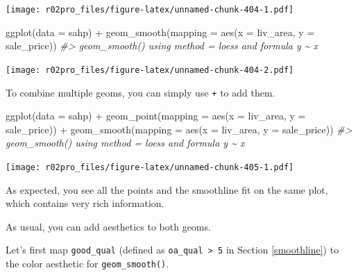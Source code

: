 \documentclass[
]{book}
\newenvironment{Shaded}{\begin{snugshade}}{\end{snugshade}}
\newcommand{\AttributeTok}[1]{\textcolor[rgb]{0.77,0.63,0.00}{#1}}
\newcommand{\CommentTok}[1]{\textcolor[rgb]{0.56,0.35,0.01}{\textit{#1}}}
\newcommand{\FunctionTok}[1]{\textcolor[rgb]{0.00,0.00,0.00}{#1}}
\newcommand{\NormalTok}[1]{#1}
\newcommand{\SpecialCharTok}[1]{\textcolor[rgb]{0.00,0.00,0.00}{#1}}
\begin{document}
\texttt{[image: r02pro\_files/figure-latex/unnamed-chunk-404-1.pdf]}

\begin{Shaded}
\begin{Highlighting}[]
\FunctionTok{ggplot}\NormalTok{(}\AttributeTok{data =}\NormalTok{ sahp) }\SpecialCharTok{+} \FunctionTok{geom\_smooth}\NormalTok{(}\AttributeTok{mapping =} \FunctionTok{aes}\NormalTok{(}\AttributeTok{x =}\NormalTok{ liv\_area, }\AttributeTok{y =}\NormalTok{ sale\_price))}
\CommentTok{\#\textgreater{} \textasciigrave{}geom\_smooth()\textasciigrave{} using method = \textquotesingle{}loess\textquotesingle{} and formula \textquotesingle{}y \textasciitilde{} x\textquotesingle{}}
\end{Highlighting}
\end{Shaded}

\texttt{[image: r02pro\_files/figure-latex/unnamed-chunk-404-2.pdf]}

To combine multiple geoms, you can simply use \texttt{+} to add them.

\begin{Shaded}
\begin{Highlighting}[]
\FunctionTok{ggplot}\NormalTok{(}\AttributeTok{data =}\NormalTok{ sahp) }\SpecialCharTok{+} \FunctionTok{geom\_point}\NormalTok{(}\AttributeTok{mapping =} \FunctionTok{aes}\NormalTok{(}\AttributeTok{x =}\NormalTok{ liv\_area, }\AttributeTok{y =}\NormalTok{ sale\_price)) }\SpecialCharTok{+} \FunctionTok{geom\_smooth}\NormalTok{(}\AttributeTok{mapping =} \FunctionTok{aes}\NormalTok{(}\AttributeTok{x =}\NormalTok{ liv\_area, }\AttributeTok{y =}\NormalTok{ sale\_price))}
\CommentTok{\#\textgreater{} \textasciigrave{}geom\_smooth()\textasciigrave{} using method = \textquotesingle{}loess\textquotesingle{} and formula \textquotesingle{}y \textasciitilde{} x\textquotesingle{}}
\end{Highlighting}
\end{Shaded}

\texttt{[image: r02pro\_files/figure-latex/unnamed-chunk-405-1.pdf]}

As expected, you see all the points and the smoothline fit on the same plot, which contains very rich information.

As usual, you can add aesthetics to both geoms.

Let's first map \texttt{good\_qual} (defined as \texttt{oa\_qual\ \textgreater{}\ 5} in Section \ref{smoothline}) to the color aesthetic for \texttt{geom\_smooth()}.
\end{document}
